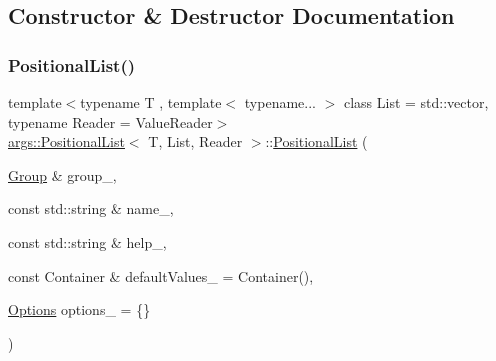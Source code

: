 \subsection{Constructor \& Destructor Documentation}
\mbox{\label{classargs_1_1_positional_list_ad9b978ced4f1b73cdebda1be5a20c9ae}} 
\subsubsection{\texorpdfstring{Positional\+List()}{PositionalList()}\hspace{0.1cm}{\footnotesize\ttfamily [1/2]}}
{\footnotesize\ttfamily template$<$typename T , template$<$ typename... $>$ class List = std\+::vector, typename Reader  = Value\+Reader$>$ \\
\hyperlink{classargs_1_1_positional_list}{args\+::\+Positional\+List}$<$ T, List, Reader $>$\+::\hyperlink{classargs_1_1_positional_list}{Positional\+List} (\begin{DoxyParamCaption}\item[{\hyperlink{classargs_1_1_group}{Group} \&}]{group\+\_\+,  }\item[{const std\+::string \&}]{name\+\_\+,  }\item[{const std\+::string \&}]{help\+\_\+,  }\item[{const Container \&}]{default\+Values\+\_\+ = {\ttfamily Container()},  }\item[{\hyperlink{namespaceargs_aa530c0f95194aa275f49a5f299ac9e77}{Options}}]{options\+\_\+ = {\ttfamily \{\}} }\end{DoxyParamCaption})\hspace{0.3cm}{\ttfamily [inline]}}

\mbox{\label{classargs_1_1_positional_list_a81dff6ac754fd0f55dcc39015ddcd1fb}} 
